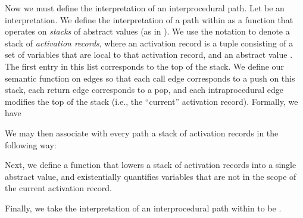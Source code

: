  Now we must define the interpretation of an interprocedural path.  Let
  be an
 interpretation.  We define the interpretation of a path within 
 as a function that operates on \emph{stacks} of abstract values (as in
 \cite{Knoop1992b,Lal2005}).  We use the notation  to denote a stack of 
 \emph{activation records}, where an activation record is a tuple  consisting of a set of variables  that are local to
 that activation record, and an abstract value .  The first entry in this
 list corresponds to the top of the stack.  We define our semantic function on
 edges so that each call edge corresponds to a push on this stack, each return
 edge corresponds to a pop, and each intraprocedural edge modifies the top of
 the stack (i.e., the ``current'' activation record).  Formally, we have

  \noindent

   \hfill

   We may then associate with every path  a stack of activation records
    in the following way:
   

   Next, we define a  function that lowers a stack of
   activation records into a single abstract value, and existentially
   quantifies variables that are not in the scope of the current activation
   record.
   

   Finally, we take the interpretation of an interprocedural path within
    to be .


